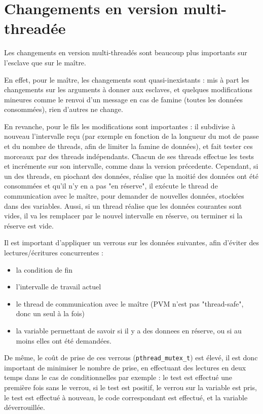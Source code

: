 \documentclass[a4paper,11pt]{article}
\begin{document}
\section{Changements en version multi-threadée}
Les changements en version multi-threadés sont beaucoup plus importants sur l'esclave que sur le maître.

En effet, pour le maître, les changements sont quasi-inexistants : mis à part les changements sur les arguments à donner aux esclaves, et quelques modifications mineures comme le renvoi d'un message en cas de famine (toutes les données consommées), rien d'autres ne change.

En revanche, pour le fils les modifications sont importantes : il subdivise à nouveau l'intervalle reçu (par exemple en fonction de la longueur du mot de passe et du nombre de threads, afin de limiter la famine de données), et fait tester ces morceaux par des threads indépendants.
Chacun de ses threads effectue les tests et incrémente sur son intervalle, comme dans la version précedente. 
Cependant, si un des threads, en piochant des données, réalise que la moitié des données ont été consommées et qu'il n'y en a pas "en réserve", il exécute le thread de communication avec le maître, pour demander de nouvelles données, stockées dans des variables.
Aussi, si un thread réalise que les données courantes sont vides, il va les remplacer par le nouvel intervalle en réserve, ou terminer si la réserve est vide.


Il est important d'appliquer un verrous sur les données suivantes, afin d'éviter des lectures/écritures concurrentes :
\begin{itemize}
\item la condition de fin 
\item l'intervalle de travail actuel
\item le thread de communication avec le maître (PVM n'est pas "thread-safe", donc un seul à la fois)
\item la variable permettant de savoir si il y a des donnees en réserve, ou si au moins elles ont été demandées.
\end{itemize}
De même, le coût de prise de ces verrous (\texttt{pthread\_mutex\_t}) est élevé, il est donc important de minimiser le nombre de prise, en effectuant des lectures en deux temps dans le cas de conditionnelles par exemple :
le test est effectué une première fois sans le verrou, si le test est positif, le verrou sur la variable est pris, le test est effectué à nouveau, le code correspondant est effectué, et la variable déverrouillée.
\end{document}
